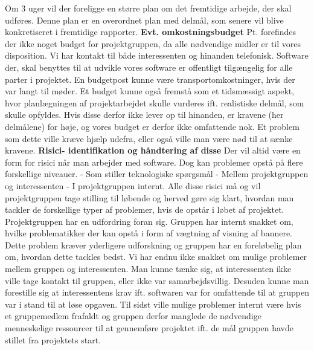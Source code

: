 \documentclass[a4paper,12pt]{article}
\begin{document}
Om 3 uger vil der foreligge en større plan om det fremtidige arbejde, der skal udføres. Denne plan er en overordnet plan med delmål, som senere vil blive konkretiseret i fremtidige rapporter.
\newline
\newline
\textbf{Evt. omkostningsbudget}
\newline
Pt. forefindes der ikke noget budget for projektgruppen, da alle nødvendige midler er til vores disposition. Vi har kontakt til både interessenten og hinanden telefonisk.
Software der, skal benyttes til at udvikle vores software er offentligt tilgængelig for alle parter i projektet.
En budgetpost kunne være transportomkostninger, hvis der var langt til møder.
Et budget kunne også fremstå som et tidsmæssigt aspekt, hvor planlægningen af projektarbejdet skulle vurderes ift. realistiske delmål, som skulle opfyldes. Hvis disse derfor ikke lever op til hinanden, er kravene (her delmålene) for høje, og vores budget er derfor ikke omfattende nok. Et problem som dette ville kræve hjælp udefra, eller også ville man være nød til at sænke kravene.
\newline
\newline
\textbf{Risici- identifikation og håndtering af disse}
\newline
Der vil altid være en form for risici når man arbejder med software. Dog kan problemer opstå på flere forskellige niveauer.
\newline 
 - Som stiller teknologiske spørgsmål
 \newline
- Mellem projektgruppen og interessenten
\newline
- I projektgruppen internt.
\newline 
Alle disse risici må og vil projektgruppen tage stilling til løbende og herved gøre sig klart, hvordan man tackler de forskellige typer af problemer, hvis de opstår i løbet af projektet.
Projektgruppen har en udfordring foran sig. Gruppen har internt snakket om, hvilke problematikker der kan opstå i form af vægtning af visning af bannere. Dette problem kræver yderligere udforskning og gruppen har en foreløbelig plan om, hvordan dette tackles bedst. 
Vi har endnu ikke snakket om mulige problemer mellem gruppen og interessenten. Man kunne tænke sig, at interessenten ikke ville tage kontakt til gruppen, eller ikke var samarbejdsvillig. Desuden kunne man forestille sig at interessentens krav ift. softwaren var for omfattende til at gruppen var i stand til at løse opgaven.
Til sidst ville mulige problemer internt være hvis et gruppemedlem frafaldt og gruppen derfor manglede de nødvendige menneskelige ressourcer til at gennemføre projektet ift. de mål gruppen havde stillet fra projektets start.
\end{document}

